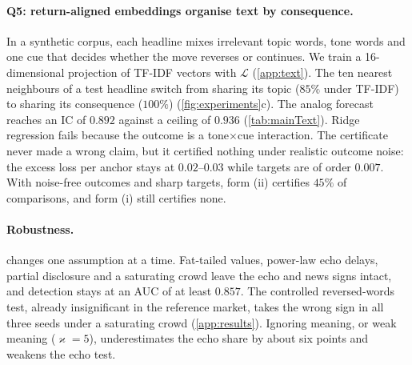 \documentclass{article}
\theoremstyle{plain}
\theoremstyle{definition}
\theoremstyle{remark}
\begin{document}
\paragraph{Q5: return-aligned embeddings organise text by consequence.} In a synthetic corpus, each headline mixes irrelevant topic words, tone words and one cue that decides whether the move reverses or continues. We train a 16-dimensional projection of TF-IDF vectors with $\mathcal{L}$ (\cref{app:text}). The ten nearest neighbours of a test headline switch from sharing its topic ($85\%$ under TF-IDF) to sharing its consequence ($100\%$) (\cref{fig:experiments}c). The analog forecast reaches an IC of $0.892$ against a ceiling of $0.936$ (\cref{tab:mainText}). Ridge regression fails because the outcome is a tone$\times$cue interaction. The certificate never made a wrong claim, but it certified nothing under realistic outcome noise: the excess loss per anchor stays at $0.02$--$0.03$ while targets are of order $0.007$. With noise-free outcomes and sharp targets, form (ii) certifies $45\%$ of comparisons, and form (i) still certifies none.

\paragraph{Robustness.}  changes one assumption at a time. Fat-tailed values, power-law echo delays, partial disclosure and a saturating crowd leave the echo and news signs intact, and detection stays at an AUC of at least $0.857$. The controlled reversed-words test, already insignificant in the reference market, takes the wrong sign in all three seeds under a saturating crowd (\cref{app:results}). Ignoring meaning, or weak meaning ($\varkappa=5$), underestimates the echo share by about six points and weakens the echo test.
\end{document}
